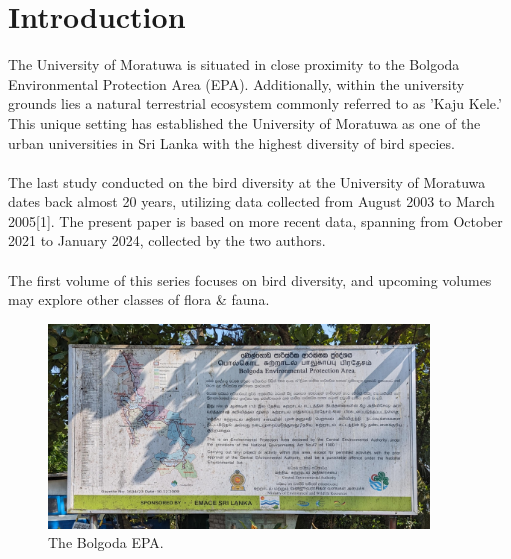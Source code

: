 \chapter{Introduction}
\label{cp:introduction}
The University of Moratuwa is situated in close proximity to the Bolgoda Environmental Protection Area (EPA). Additionally, within the university grounds lies a natural terrestrial ecosystem commonly referred to as 'Kaju Kele.' This unique setting has established the University of Moratuwa as one of the urban universities in Sri Lanka with the highest diversity of bird species.
\\\\
The last study conducted on the bird diversity at the University of Moratuwa dates back almost 20 years, utilizing data collected from August 2003 to March 2005[1]. The present paper is based on more recent data, spanning from October 2021 to January 2024, collected by the two authors.
\\\\
The first volume of this series focuses on bird diversity, and upcoming volumes may explore other classes of flora \& fauna.
\begin{figure}[!htpb]
    \centering
    \includegraphics[width=0.9\textwidth]{Figures/epa.jpg}
    \caption[]{The Bolgoda EPA.}
    \label{fig:figure-01}
\end{figure}

